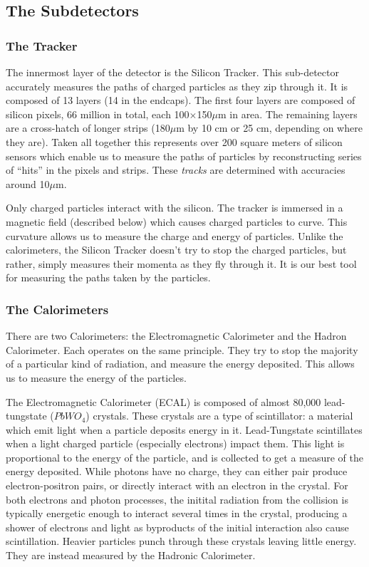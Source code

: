 \subsection{The Subdetectors}
\subsubsection{The Tracker}
The innermost layer of the detector is the Silicon Tracker. This sub-detector accurately measures the paths of charged particles as they zip through it. It is composed of 13 layers (14 in the endcaps). The first four layers are composed of silicon pixels, 66 million in total, each 100$\times$150$\mu$m in area. The remaining layers are a cross-hatch of longer strips (180$\mu$m by 10 cm or 25 cm, depending on where they are). Taken all together this represents over 200 square meters of silicon sensors which enable us to measure the paths of particles by reconstructing series of ``hits'' in the pixels and strips. These \textit{tracks} are determined with accuracies around 10$\mu$m.

Only charged particles interact with the silicon. The tracker is immersed in a magnetic field (described below) which causes charged particles to curve. This curvature allows us to measure the charge and energy of particles. Unlike the calorimeters, the Silicon Tracker doesn't try to stop the charged particles, but rather, simply measures their momenta as they fly through it. It is our best tool for measuring the paths taken by the particles.
\subsubsection{The Calorimeters}
There are two Calorimeters: the Electromagnetic Calorimeter and the Hadron Calorimeter. Each operates on the same principle. They try to stop the majority of a particular kind of radiation, and measure the energy deposited. This allows us to measure the energy of the particles.

The Electromagnetic Calorimeter (ECAL) is composed of almost 80,000 lead-tungstate ($PbWO_4$) crystals. These crystals are a type of scintillator: a material which emit light when a particle deposits energy in it. Lead-Tungstate scintillates when a light charged particle (especially electrons) impact them. This light is proportional to the energy of the particle, and is  collected to get a measure of the energy deposited. While photons have no charge, they can either pair produce electron-positron pairs, or directly interact with an electron in the crystal. For both electrons and photon processes, the initital radiation from the collision is typically energetic enough to interact several times in the crystal, producing a shower of electrons and light as byproducts of the initial interaction also cause scintillation. Heavier particles punch through these crystals leaving little energy. They are instead measured by the Hadronic Calorimeter.

